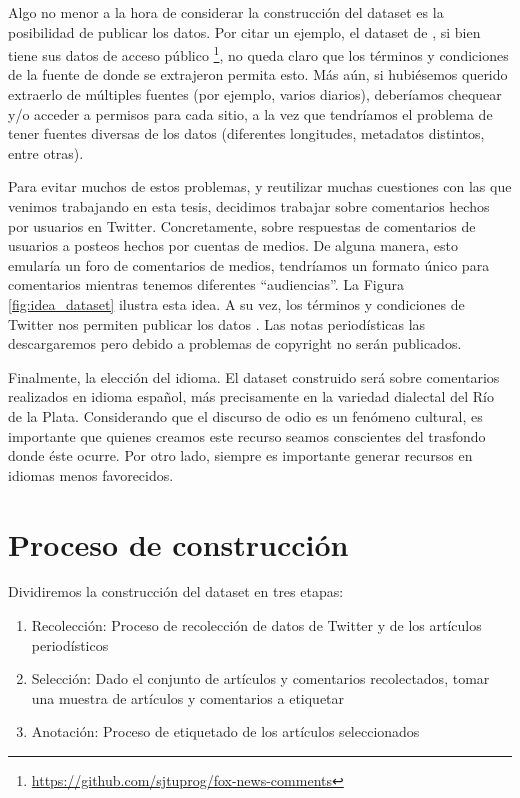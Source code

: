 Algo no menor a la hora de considerar la construcción del dataset es la posibilidad de publicar los datos. Por citar un ejemplo, el dataset de \citet{gao-huang-2017-detecting}, si bien tiene sus datos de acceso público \footnote{\url{https://github.com/sjtuprog/fox-news-comments}}, no queda claro que los términos y condiciones de la fuente de donde se extrajeron permita esto. Más aún, si hubiésemos querido extraerlo de múltiples fuentes (por ejemplo, varios diarios), deberíamos chequear y/o acceder a permisos para cada sitio, a la vez que tendríamos el problema de tener fuentes diversas de los datos (diferentes longitudes, metadatos distintos, entre otras).

Para evitar muchos de estos problemas, y reutilizar muchas cuestiones con las que venimos trabajando en esta tesis, decidimos trabajar sobre comentarios hechos por usuarios en Twitter. Concretamente, sobre respuestas de comentarios de usuarios a posteos hechos por cuentas de medios. De alguna manera, esto emularía un foro de comentarios de medios, tendríamos un formato único para comentarios mientras tenemos diferentes ``audiencias''. La Figura \ref{fig:idea_dataset} ilustra esta idea. A su vez, los términos y condiciones de Twitter nos permiten publicar los datos . Las notas periodísticas las descargaremos pero debido a problemas de copyright no serán publicados.

Finalmente, la elección del idioma. El dataset construido será sobre comentarios realizados en idioma español, más precisamente en la variedad dialectal del Río de la Plata. Considerando que el discurso de odio es un fenómeno cultural, es importante que quienes creamos este recurso seamos conscientes del trasfondo donde éste ocurre. Por otro lado, siempre es importante generar recursos en idiomas menos favorecidos.


\section{Proceso de construcción}

Dividiremos la construcción del dataset en tres etapas:

\begin{enumerate}
    \item Recolección: Proceso de recolección de datos de Twitter y de los artículos periodísticos
    \item Selección: Dado el conjunto de artículos y comentarios recolectados, tomar una muestra de artículos y comentarios a etiquetar
    \item Anotación: Proceso de etiquetado de los artículos seleccionados
\end{enumerate}

